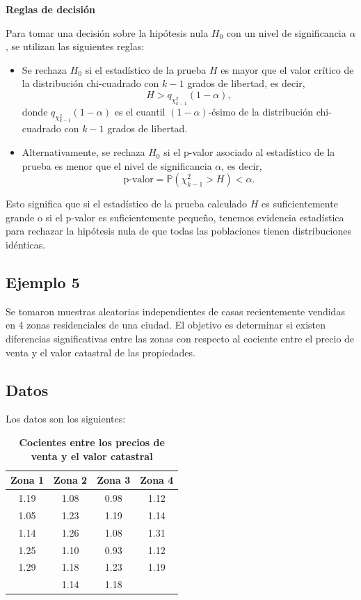 \documentclass{article}
\begin{document}
\textbf{Reglas de decisión}

Para tomar una decisión sobre la hipótesis nula $H_0$ con un nivel de significancia $\alpha$, se utilizan las siguientes reglas:

\begin{itemize}
    \item Se rechaza $H_0$ si el estadístico de la prueba $H$ es mayor que el valor crítico de la distribución chi-cuadrado con $k-1$ grados de libertad, es decir,
          \[ H > q_{\chi^2_{k-1}}(1- \alpha), \]
          donde $q_{\chi^2_{k-1}}(1- \alpha)$ es el cuantil $(1-\alpha)$-ésimo de la distribución chi-cuadrado con $k-1$ grados de libertad.

    \item Alternativamente, se rechaza $H_0$ si el p-valor asociado al estadístico de la prueba es menor que el nivel de significancia $\alpha$, es decir,
          \[ \text{p-valor} = \mathbb{P}(\chi^2_{k-1} > H) < \alpha. \]
\end{itemize}

Esto significa que si el estadístico de la prueba calculado $H$ es suficientemente grande o si el p-valor es suficientemente pequeño, tenemos evidencia estadística para rechazar la hipótesis nula de que todas las poblaciones tienen distribuciones idénticas.
\newpage
\subsection*{Ejemplo 5}

Se tomaron muestras aleatorias independientes de casas recientemente vendidas en 4 zonas residenciales de una ciudad. El objetivo es determinar si existen diferencias significativas entre las zonas con respecto al cociente entre el precio de venta y el valor catastral de las propiedades.

\subsection*{Datos}

Los datos son los siguientes:

\begin{table}[ht]
    \centering
    \caption{\textbf{Cocientes entre los precios de venta y el valor catastral}}
    \begin{tabular}{cccc}
        \toprule
        Zona 1 & Zona 2 & Zona 3 & Zona 4 \\
        \midrule
        1.19   & 1.08   & 0.98   & 1.12   \\
        1.05   & 1.23   & 1.19   & 1.14   \\
        1.14   & 1.26   & 1.08   & 1.31   \\
        1.25   & 1.10   & 0.93   & 1.12   \\
        1.29   & 1.18   & 1.23   & 1.19   \\
               & 1.14   & 1.18   &        \\
        \bottomrule
    \end{tabular}
\end{table}
\end{document}

